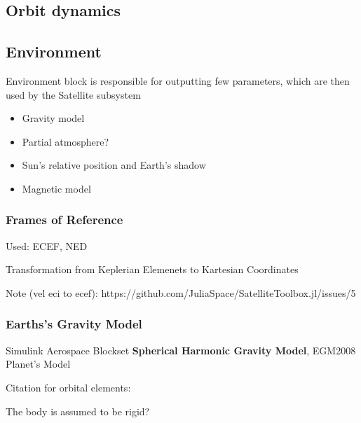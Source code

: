 \subsection{Orbit dynamics}

\subsection{Environment}
    Environment block is responsible for outputting few parameters, which are then used by the Satellite subsystem
    \begin{itemize}
        \item Gravity model
        \item Partial atmosphere?
        \item Sun's relative position and Earth's shadow
        \item Magnetic model
    \end{itemize}

    \subsubsection{Frames of Reference}
        Used: ECEF, NED

        Transformation from Keplerian Elemenets to Kartesian Coordinates

	Note (vel eci to ecef): https://github.com/JuliaSpace/SatelliteToolbox.jl/issues/5

    \subsubsection{Earths's Gravity Model}
        Simulink Aerospace Blockset \textbf{Spherical Harmonic Gravity Model}, EGM2008 Planet's Model

    Citation for orbital elements: \cite{vallado2001fundamentals}

    The body is assumed to be rigid?
